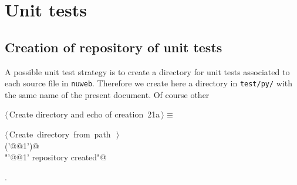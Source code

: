 \documentclass[11pt,oneside]{article}	%
\begin{document}
\section{Unit tests}
\label{sec:tests}

\subsection{Creation of repository of unit tests}

A possible unit test strategy is to create a directory for unit tests associated to each source file in \texttt{nuweb}. Therefore we create here a directory in \texttt{test/py/} with the same name of the present document. Of course other 

\begin{flushleft} \small
\begin{minipage}{\linewidth} \label{scrap32}
\protect{}$\langle\,$Create directory and echo of creation\nobreak\ {\footnotesize 21a}$\,\rangle\equiv$
\vspace{-1ex}
\begin{list}{}{} \item
\mbox{}\verb@@\hbox{$\langle\,$Create directory from path\nobreak\ {\footnotesize {}}$\,\rangle$}\verb@@\\
\mbox{}\verb@createDir('@@1\verb@')@\\
\mbox{}\verb@print "'@@1\verb@' repository created"@\\
\mbox{}\verb@@{\NWsep}
\end{list}
\vspace{-1ex}
\footnotesize\addtolength{\baselineskip}{-1ex}
\begin{list}{}{\setlength{\itemsep}{-\parsep}\setlength{\itemindent}{-\leftmargin}}
\item {\NWtxtMacroNoRef}.
\end{list}
\end{minipage}\\[4ex]
\end{flushleft}
\end{document}

